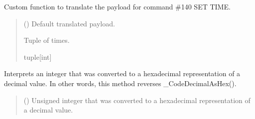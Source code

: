 \documentclass[letterpaper,10pt,english]{sphinxmanual}
\begin{document}
\begin{fulllineitems}

\begin{fulllineitems}
\label{\detokenize{Morelia.Devices:Morelia.Devices.PodDevice_8229.Pod8229._Custom140SETTIME}}
\pysigstartsignatures
{}
\pysigstopsignatures
\sphinxAtStartPar
Custom function to translate the payload for command \#140 SET TIME.
\begin{quote}\begin{description}
\sphinxAtStartPar
{} (\sphinxstyleliteralemphasis{\sphinxupquote{{[}}}\sphinxstyleliteralemphasis{\sphinxupquote{{]}}}) \textendash{} Default translated payload.

\sphinxAtStartPar
Tuple of times.

\sphinxAtStartPar
tuple{[}int{]}

\end{description}\end{quote}

\end{fulllineitems}


\begin{fulllineitems}
\label{\detokenize{Morelia.Devices:Morelia.Devices.PodDevice_8229.Pod8229._DecodeDecimalAsHex}}
\pysigstartsignatures
{}
\pysigstopsignatures
\sphinxAtStartPar
Interprets an integer that was converted to a hexadecimal representation of a         decimal value. In other words, this method reverses \_CodeDecimalAsHex().
\begin{quote}\begin{description}
\sphinxAtStartPar
{} () \textendash{} Unsigned integer that was converted to a hexadecimal representation of a                 decimal value.


\end{description}
\end{quote}
\end{fulllineitems}
\end{fulllineitems}
\end{document}
